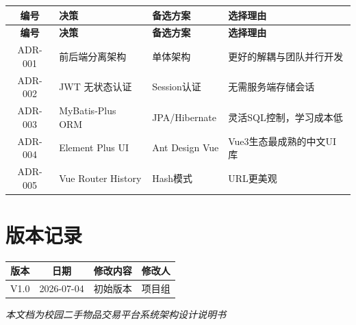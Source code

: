 \documentclass[12pt,a4paper,UTF8]{ctexart}
\begin{document}
\begin{longtable}{|c|p{}|p{}|p{}|}
    \hline
    \textbf{编号} & \textbf{决策} & \textbf{备选方案} & \textbf{选择理由} \\
    \hline
    \endfirsthead
    \hline
    \textbf{编号} & \textbf{决策} & \textbf{备选方案} & \textbf{选择理由} \\
    \hline
    \endhead
    \hline
    \endfoot

    ADR-001 & 前后端分离架构 & 单体架构 & 更好的解耦与团队并行开发 \\
    \hline
    ADR-002 & JWT 无状态认证 & Session认证 & 无需服务端存储会话 \\
    \hline
    ADR-003 & MyBatis-Plus ORM & JPA/Hibernate & 灵活SQL控制，学习成本低 \\
    \hline
    ADR-004 & Element Plus UI & Ant Design Vue & Vue3生态最成熟的中文UI库 \\
    \hline
    ADR-005 & Vue Router History & Hash模式 & URL更美观 \\
    \hline
\end{longtable}

\section{版本记录}

\begin{longtable}{|c|c|c|c|}
    \hline
    \textbf{版本} & \textbf{日期} & \textbf{修改内容} & \textbf{修改人} \\
    \hline
    V1.0 & 2026-07-04 & 初始版本 & 项目组 \\
    \hline
\end{longtable}

\vfill
\begin{center}
    \textit{本文档为校园二手物品交易平台系统架构设计说明书}
\end{center}
\end{document}
